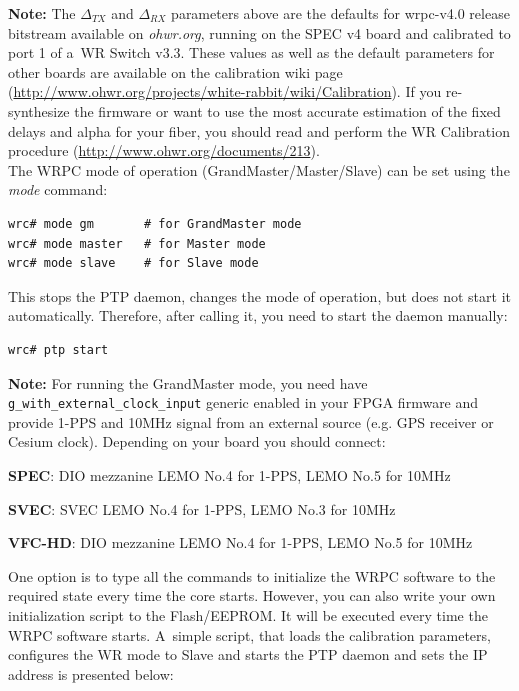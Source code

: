 \documentclass[a4paper, 12pt]{article}
\begin{document}
\noindent\textbf{Note:} The $\Delta_{TX}$ and $\Delta_{RX}$ parameters above are
the defaults for wrpc-v4.0 release bitstream available on \textit{ohwr.org},
running on the SPEC v4 board and calibrated to port 1 of a~WR Switch
v3.3. These values as well as the default parameters for other boards are
available on the calibration wiki page
(\url{http://www.ohwr.org/projects/white-rabbit/wiki/Calibration}). If you
re-synthesize the firmware or want to use the most accurate estimation of
the fixed delays and alpha for your fiber, you should read and perform the WR
Calibration procedure (\url{http://www.ohwr.org/documents/213}).\\

The WRPC  mode of operation (GrandMaster/Master/Slave) can be set
using the \textit{mode} command:

\begin{lstlisting}
wrc# mode gm       # for GrandMaster mode
wrc# mode master   # for Master mode
wrc# mode slave    # for Slave mode
\end{lstlisting}

This stops the PTP daemon, changes the mode of operation, but does not start it
automatically. Therefore, after calling it, you need to start the daemon
manually:

\begin{lstlisting}
wrc# ptp start
\end{lstlisting}

\noindent\textbf{Note:} For running the GrandMaster mode, you need have
\texttt{g\_with\_external\_clock\_input} generic enabled in your FPGA firmware
and provide 1-PPS and 10MHz signal from an external source (e.g. GPS receiver or
Cesium clock). Depending on your board you should connect:
\begin{itemize*}
  \item \textbf{SPEC}: DIO mezzanine LEMO No.4 for 1-PPS, LEMO No.5 for 10MHz
  \item \textbf{SVEC}: SVEC LEMO No.4 for 1-PPS, LEMO No.3 for 10MHz
  \item \textbf{VFC-HD}: DIO mezzanine LEMO No.4 for 1-PPS, LEMO No.5 for 10MHz
\end{itemize*}

\vspace{1em}
One option is to type all the commands to initialize the WRPC software to
the required state every time the core starts. However, you can also write your
own initialization script to the Flash/EEPROM. It will be executed every time
the WRPC software starts. A~simple script, that loads the calibration
parameters, configures the WR mode to Slave and starts the PTP daemon and sets
the IP address is presented below:
\end{document}

